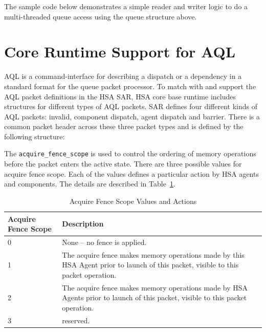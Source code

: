 \documentclass{book}
\begin{document}
The sample code below demonstrates a simple reader and writer logic
to do a multi-threaded queue access using the queue structure above.

\begin{framed}

\end{framed}

\hypertarget{coreapi_AQL}{}\section{Core Runtime Support for
AQL}\label{AQL}
AQL is a command-interface for describing a dispatch or a dependency
in a standard format for the queue packet processor.
To match with and support the AQL packet definitions in the HSA SAR,
HSA core base runtime includes structures for different types of AQL
packets.  SAR defines four different kinds of AQL packets: invalid,
component dispatch, agent dispatch and barrier.  There is a common
packet header across these three packet types and is defined by the
following structure:



The \texttt{acquire\_fence\_scope} is used to control the ordering
of memory operations before the packet enters the active state.
There are three possible values for acquire fence scope. Each of the
values defines a particular action by HSA agents and components. The
details are described in Table~\ref{acquirefencescope}.

\begin{table}
  \begin{center}
    \begin{tabular}{|p{1in}|p{5in}|}
      \hline
      \textbf{Acquire Fence Scope} &\textbf{Description} \\
      \hline
      0	& None -- no fence is applied. \\
      \hline
      1	& The acquire fence makes memory operations made by this HSA
      Agent prior to launch of this packet, visible to this packet
      operation. \\
      \hline
      2	& The acquire fence makes memory operations made by HSA
      Agents prior to launch of this packet, visible to this packet
      operation.\\
      \hline
      3	& reserved. \\
      \hline
    \end{tabular}
  \end{center}
  \caption{Acquire Fence Scope Values and Actions}
  \label{acquirefencescope}
\end{table}
\end{document}
